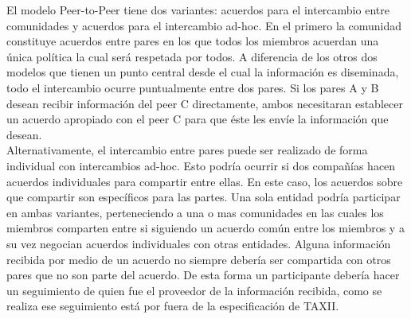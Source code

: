 El modelo Peer-to-Peer tiene dos variantes: acuerdos para el intercambio entre 
comunidades y acuerdos para el intercambio ad-hoc. En el primero la comunidad 
constituye acuerdos entre pares en los que todos los miembros acuerdan una única 
política la cual será respetada por todos. A diferencia de los otros dos 
modelos que tienen un punto central desde el cual la información es diseminada, 
todo el intercambio ocurre puntualmente entre dos pares. Si los pares A y B 
desean recibir información del peer C directamente, ambos necesitaran 
establecer un acuerdo apropiado con el peer C para que éste les envíe la 
información que desean.\\

Alternativamente, el intercambio entre pares puede ser realizado de forma 
individual con intercambios ad-hoc. Esto podría ocurrir si dos compañías hacen 
acuerdos individuales para compartir entre ellas. En este caso, los acuerdos 
sobre que compartir son específicos para las partes. Una sola entidad podría 
participar en ambas variantes, perteneciendo a una o mas comunidades en las 
cuales los miembros comparten entre si siguiendo un acuerdo común entre los 
miembros y a su vez negocian acuerdos individuales con otras entidades. Alguna 
información recibida por medio de un acuerdo no siempre debería ser compartida 
con otros pares que no son parte del acuerdo. De esta forma un participante 
debería hacer un seguimiento de quien fue el proveedor de la información 
recibida, como se realiza ese seguimiento está por fuera de la especificación de 
TAXII.\\

